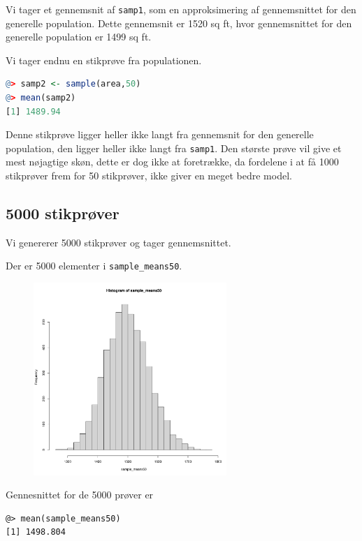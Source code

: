 \documentclass{article}
\begin{document}
Vi tager et gennemsnit af \texttt{samp1}, som en approksimering af gennemsnittet
for den generelle population. Dette gennemsnit er 1520 sq ft, hvor  gennemsnittet for
den generelle population er 1499 sq ft. 

Vi tager endnu en stikprøve fra populationen.
\begin{lstlisting}[basicstyle=\ttfamily,language=R]
@> samp2 <- sample(area,50)
@> mean(samp2)
[1] 1489.94
\end{lstlisting}
Denne stikprøve ligger heller ikke langt fra gennemsnit for den generelle
population, den ligger heller ikke langt fra \texttt{samp1}. Den største prøve
vil give et mest nøjagtige skøn, dette er dog ikke at foretrække, da fordelene i
at få 1000 stikprøver frem for 50 stikprøver, ikke giver en meget bedre model.

\subsection{5000 stikprøver}
Vi genererer 5000 stikprøver og tager gennemsnittet.

Der er 5000 elementer i \texttt{sample\_means50}.
\begin{figure}[H]
  \centering
  \includegraphics[width=0.65\textwidth]{../sample_means50.pdf}
\end{figure}
Gennesnittet for de 5000 prøver er 
\begin{lstlisting}
@> mean(sample_means50)
[1] 1498.804
\end{lstlisting}
\end{document}

